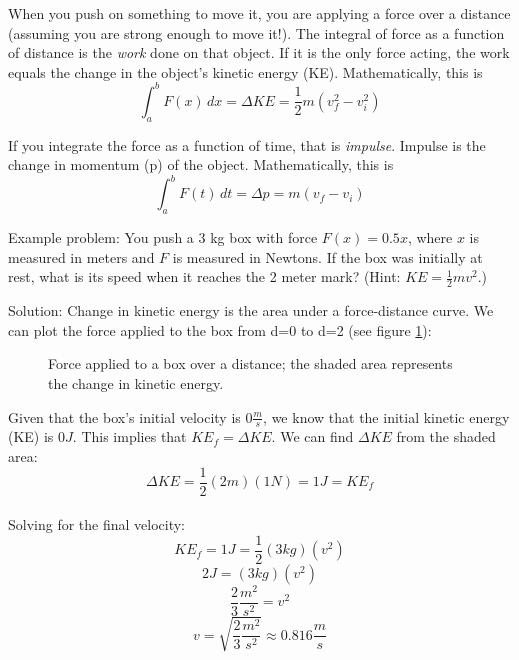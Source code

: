 When you push on something to move it, you are applying a force over 
a distance (assuming you are strong enough to move it!). The integral 
of force as a function of distance is the \textit{work} done on that 
object. If it is the only force acting, the work equals the change in the object's kinetic energy (KE). 
Mathematically, this is $$\int_{a}^{b} F(x)\,dx = \Delta KE = 
\frac{1}{2} m (v_f^2 - v_i^2)$$

If you integrate the force as a function of time, that is 
\textit{impulse}. Impulse is the change in momentum (p) of the 
object. Mathematically, this is $$\int_{a}^{b} F(t)\,dt = \Delta p 
= m (v_f - v_i)$$

Example problem: You push a 3 kg box with force $F(x) = 0.5x$, where 
$x$ is measured in meters and $F$ is measured in Newtons. If the box 
was initially at rest, what is its speed when it reaches the 2 meter 
mark? (Hint: $KE = \frac{1}{2} m v^2$.) 

Solution: Change in kinetic energy is the area under a force-distance 
curve. We can plot the force applied to the box from d=0 to d=2 (see 
figure \ref{fig:KEbox}):

\begin{figure}[H]
 \caption{Force applied to a box over a distance; the shaded area 
 represents the change in kinetic energy.}
 \label{fig:KEbox}
\end{figure}

Given that the box's initial velocity is $0 \frac{m}{s}$, we know that 
the initial kinetic energy (KE) is $0J$. This implies that $KE_f = 
\Delta KE$. We can find $\Delta KE$ from the shaded area:\\
$$\Delta KE = \frac{1}{2} (2m) (1N) = 1 J = KE_f$$\\
Solving for the final velocity:\\
$$KE_f = 1 J = \frac{1}{2}(3kg)(v^2)$$
$$2 J = (3 kg) (v^2)$$
$$\frac{2}{3} \frac{m^2}{s^2} = v^2$$
$$v=\sqrt{\frac{2}{3} \frac{m^2}{s^2}} \approx 0.816 \frac{m}{s}$$

